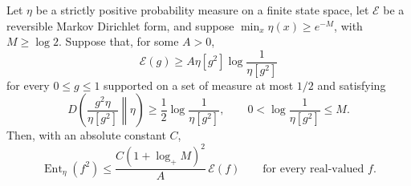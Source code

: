 \begin{lemma}\label{cap:layer-lemma}
Let $\eta$ be a strictly positive probability measure on a finite state
space, let $\mathcal E$ be a reversible Markov Dirichlet form, and suppose
$\min_x\eta(x)\ge e^{-M}$, with $M\ge\log2$. Suppose that, for some $A>0$,
\[
 \mathcal E(g)\ge A\eta[g^2]\log\frac1{\eta[g^2]}
\]
for every $0\le g\le1$ supported on a set of measure at most $1/2$ and
satisfying
\[
 D\!\left(\frac{g^2\eta}{\eta[g^2]}\middle\Vert\eta\right)
 \ge\frac12\log\frac1{\eta[g^2]},\qquad
 0<\log\frac1{\eta[g^2]}\le M.
\]
Then, with an absolute constant $C$,
\begin{equation}\label{cap:layer-lsi}
 \operatorname{Ent}_{\eta}(f^2)
 \le \frac{C(1+\log_+M)^2}{A}\,\mathcal E(f)
 \qquad\text{for every real-valued }f.
\end{equation}
\end{lemma}

